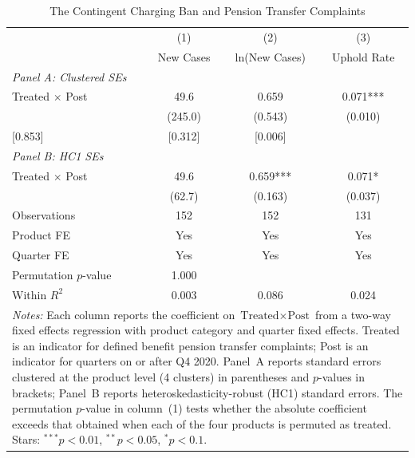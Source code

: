 \begin{table}[t]
\centering
\caption{The Contingent Charging Ban and Pension Transfer Complaints}
\label{tab:main}
\begin{tabular}{lccc}
\hline\hline
& (1) & (2) & (3) \\
& New Cases & ln(New Cases) & Uphold Rate \\
\hline
\textit{Panel A: Clustered SEs} & & & \\
Treated $\times$ Post & 49.6 & 0.659 & 0.071*** \\
& (245.0) & (0.543) & (0.010) \\
{[0.853]} & {[0.312]} & {[0.006]} \\
\hline
\textit{Panel B: HC1 SEs} & & & \\
Treated $\times$ Post & 49.6 & 0.659*** & 0.071* \\
& (62.7) & (0.163) & (0.037) \\
\hline
Observations & 152 & 152 & 131 \\
Product FE & Yes & Yes & Yes \\
Quarter FE & Yes & Yes & Yes \\
Permutation $p$-value & 1.000 & & \\
Within $R^2$ & 0.003 & 0.086 & 0.024 \\
\hline\hline
\multicolumn{4}{p{0.9\textwidth}}{\footnotesize \textit{Notes:} Each column reports the coefficient on $\text{Treated} \times \text{Post}$ from a two-way fixed effects regression with product category and quarter fixed effects. Treated is an indicator for defined benefit pension transfer complaints; Post is an indicator for quarters on or after Q4 2020. Panel~A reports standard errors clustered at the product level (4 clusters) in parentheses and $p$-values in brackets; Panel~B reports heteroskedasticity-robust (HC1) standard errors. The permutation $p$-value in column~(1) tests whether the absolute coefficient exceeds that obtained when each of the four products is permuted as treated. Stars: $^{***}p<0.01$, $^{**}p<0.05$, $^{*}p<0.1$.}
\end{tabular}
\end{table}
